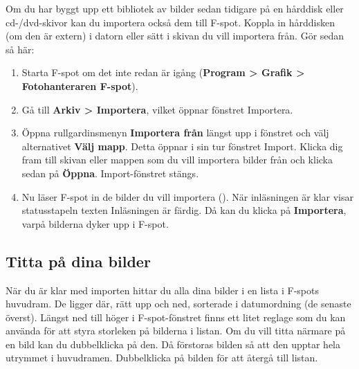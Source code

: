 \documentclass[a4paper,final]{memoir} %
\begin{document}

Om du har byggt upp ett bibliotek av bilder sedan tidigare på en hårddisk eller cd-/dvd-skivor kan du importera också dem till F-spot. Koppla in hårddisken (om den är extern) i datorn eller sätt i skivan du vill importera från. Gör sedan så här:

\begin{enumerate}

\item Starta F-spot om det inte redan är igång (\textbf{Program \textgreater{} Grafik \textgreater{} Fotohanteraren F-spot}).

\item Gå till \textbf{Arkiv \textgreater{} Importera}, vilket öppnar fönstret Importera.

\item Öppna rullgardinsmenyn \textbf{Importera från} längst upp i fönstret och välj alternativet \textbf{Välj mapp}. Detta öppnar i sin tur fönstret Import. Klicka dig fram till skivan eller mappen som du vill importera bilder från och klicka sedan på \textbf{Öppna}. Import-fönstret stängs.

\item Nu läser F-spot in de bilder du vill importera (). När inläsningen är klar visar statusstapeln texten Inläsningen är färdig. Då kan du klicka på \textbf{Importera}, varpå bilderna dyker upp i F-spot.

\end{enumerate}



\subsection{Titta på dina bilder}


När du är klar med importen hittar du alla dina bilder i en lista i F-spots huvudram. De ligger där, rätt upp och ned, sorterade i datumordning (de senaste överst). Längst ned till höger i F-spot-fönstret finns ett litet reglage som du kan använda för att styra storleken på bilderna i listan. Om du vill titta närmare på en bild kan du dubbelklicka på den. Då förstoras bilden så att den upptar hela utrymmet i huvudramen. Dubbelklicka på bilden för att återgå till listan.
\end{document}
